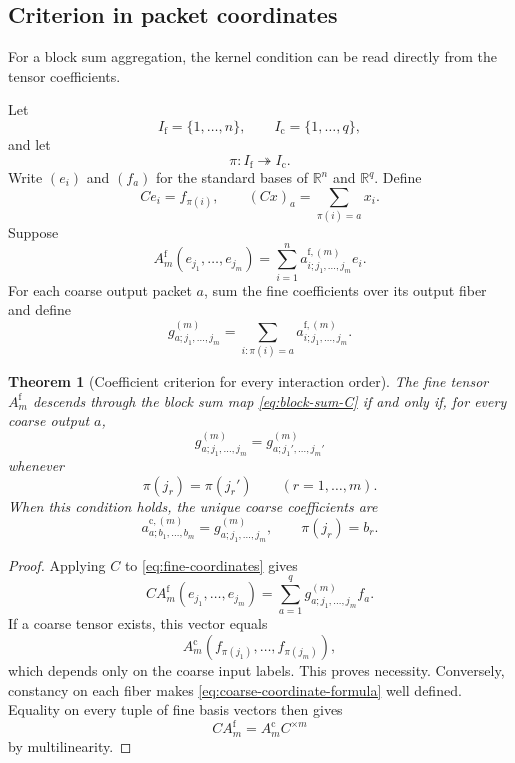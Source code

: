 \documentclass[11pt]{article}
\newtheorem{theorem}{Theorem}[section]
\theoremstyle{definition}
\theoremstyle{remark}
\newcommand{\R}{\mathbb R}
\newcommand{\fine}{\mathrm f}
\newcommand{\coarse}{\mathrm c}
\begin{document}
\subsection{Criterion in packet coordinates}
For a block sum aggregation, the kernel condition can be read directly from the tensor coefficients.

Let
\[
  I_{\fine}=\{1,\ldots,n\},
  \qquad
  I_{\coarse}=\{1,\ldots,q\},
\]
and let
\[
  \pi:I_{\fine}\twoheadrightarrow I_{\coarse}.
\]
Write $(e_i)$ and $(f_a)$ for the standard bases of $\R^n$ and $\R^q$.  Define
\begin{equation}\label{eq:block-sum-C}
  Ce_i=f_{\pi(i)},
  \qquad
  (Cx)_a=\sum_{\pi(i)=a}x_i.
\end{equation}
Suppose
\begin{equation}\label{eq:fine-coordinates}
  A_m^{\fine}(e_{j_1},\ldots,e_{j_m})
  =
  \sum_{i=1}^n
  a^{\fine,(m)}_{i;j_1,\ldots,j_m}e_i.
\end{equation}
For each coarse output packet $a$, sum the fine coefficients over its output fiber and define
\begin{equation}\label{eq:aggregated-coefficient}
  g^{(m)}_{a;j_1,\ldots,j_m}
  =
  \sum_{i:\pi(i)=a}
  a^{\fine,(m)}_{i;j_1,\ldots,j_m}.
\end{equation}

\begin{theorem}[Coefficient criterion for every interaction order]\label{thm:packet-coordinate-criterion}
The fine tensor $A_m^{\fine}$ descends through the block sum map \eqref{eq:block-sum-C} if and only if, for every coarse output $a$,
\begin{equation}\label{eq:packet-fiber-constancy}
  g^{(m)}_{a;j_1,\ldots,j_m}
  =
  g^{(m)}_{a;j_1',\ldots,j_m'}
\end{equation}
whenever
\[
  \pi(j_r)=\pi(j_r')
  \qquad(r=1,\ldots,m).
\]
When this condition holds, the unique coarse coefficients are
\begin{equation}\label{eq:coarse-coordinate-formula}
  a^{\coarse,(m)}_{a;b_1,\ldots,b_m}
  =
  g^{(m)}_{a;j_1,\ldots,j_m},
  \qquad
  \pi(j_r)=b_r.
\end{equation}
\end{theorem}

\begin{proof}
Applying $C$ to \eqref{eq:fine-coordinates} gives
\[
  CA_m^{\fine}(e_{j_1},\ldots,e_{j_m})
  =
  \sum_{a=1}^q
  g^{(m)}_{a;j_1,\ldots,j_m}f_a.
\]
If a coarse tensor exists, this vector equals
\[
  A_m^{\coarse}(f_{\pi(j_1)},\ldots,f_{\pi(j_m)}),
\]
which depends only on the coarse input labels.  This proves necessity.  Conversely, constancy on each fiber makes \eqref{eq:coarse-coordinate-formula} well defined.  Equality on every tuple of fine basis vectors then gives
\[
  CA_m^{\fine}=A_m^{\coarse}C^{\times m}
\]
by multilinearity.
\end{proof}
\end{document}
